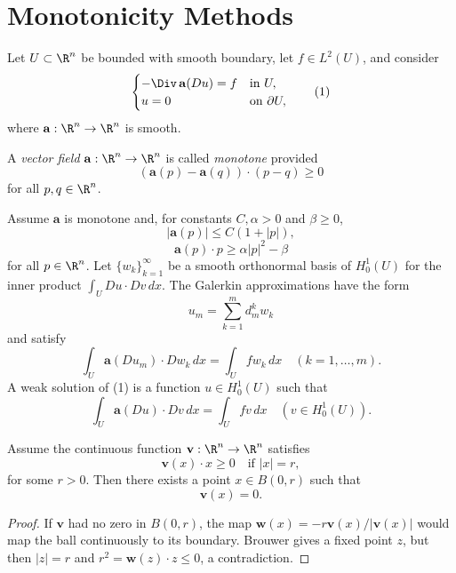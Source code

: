 
\section{Monotonicity Methods}
\label{sec:monotonicity-methods}

Let $U\subset\R^n$ be bounded with smooth boundary, let $f\in L^2(U)$, and consider
\[
\begin{cases}
-\Div\,\mathbf a(Du)=f & \text{in }U,\\
u=0 & \text{on }\partial U,
\end{cases}
\tag{1}
\]
where $\mathbf a:\R^n\to\R^n$ is smooth.

\begin{definition}
\label{def:monotone-vector-field}
A \textit{vector field} $\mathbf{a} : \R^n \to \R^n$ is called \textit{monotone} provided
\[
(\mathbf{a}(p) - \mathbf{a}(q)) \cdot (p - q) \geq 0
\tag{3}
\]
for all $p, q \in \R^n$.
\end{definition}

Assume $\mathbf a$ is monotone and, for constants $C,\alpha>0$ and $\beta\geq0$,
\[
|\mathbf a(p)|\leq C(1+|p|),
\tag{4}
\]
\[
\mathbf a(p)\cdot p\geq\alpha|p|^2-\beta
\tag{5}
\]
for all $p\in\R^n$. Let $\{w_k\}_{k=1}^\infty$ be a smooth orthonormal basis of $H_0^1(U)$ for the inner product
$\int_U Du\cdot Dv\,dx$. The Galerkin approximations have the form
\[
u_m=\sum_{k=1}^m d_m^k w_k
\tag{6}
\]
and satisfy
\[
\int_U\mathbf a(Du_m)\cdot Dw_k\,dx=\int_Ufw_k\,dx
\quad(k=1,\ldots,m).
\tag{7}
\]
A weak solution of (1) is a function $u\in H_0^1(U)$ such that
\[
\int_U\mathbf a(Du)\cdot Dv\,dx=\int_Ufv\,dx
\quad(v\in H_0^1(U)).
\tag{12}
\]

\begin{lemma}
\label{lem:zeros-of-a-vector-field}
Assume the continuous function $\mathbf{v} : \R^n \to \R^n$ satisfies
\[
\mathbf{v}(x) \cdot x \geq 0 \quad \text{if } |x| = r,
\tag{8}
\]
for some $r > 0$. Then there exists a point $x \in B(0,r)$ such that
\[
\mathbf{v}(x) = 0.
\]
\end{lemma}

\begin{proof}
\sketch If $\mathbf v$ had no zero in $B(0,r)$, the map $\mathbf w(x)=-r\mathbf v(x)/|\mathbf v(x)|$ would map the ball continuously to its boundary. Brouwer gives a fixed point $z$, but then $|z|=r$ and $r^2=\mathbf w(z)\cdot z\leq0$, a contradiction.
\end{proof}

